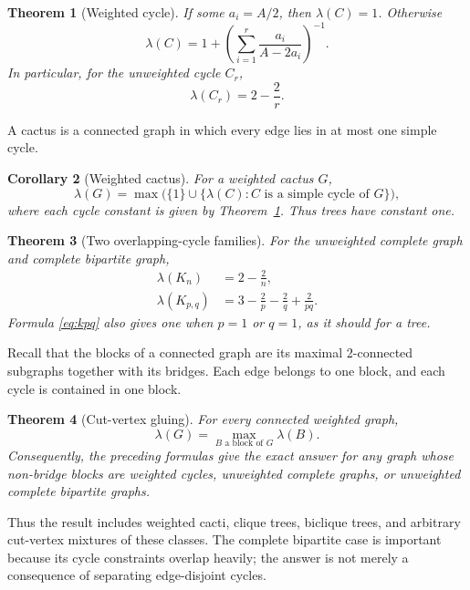 \documentclass[11pt]{article}
\newtheorem{theorem}{Theorem}
\newtheorem{corollary}[theorem]{Corollary}
\begin{document}
\begin{theorem}[Weighted cycle]\label{thm:cycle}
If some \(a_i=A/2\), then \(\lambda(C)=1\).  Otherwise
\begin{equation}\label{eq:cycle}
 \boxed{\displaystyle
 \lambda(C)=1+
 \left(\sum_{i=1}^r\frac{a_i}{A-2a_i}\right)^{-1}.}
\end{equation}
In particular, for the unweighted cycle \(C_r\),
\[
 \lambda(C_r)=2-\frac2r.
\]
\end{theorem}

A cactus is a connected graph in which every edge lies in at most one
simple cycle.

\begin{corollary}[Weighted cactus]\label{cor:cactus}
For a weighted cactus \(G\),
\[
 \lambda(G)=\max\bigl(\{1\}\cup\{\lambda(C):C\text{ is a simple cycle of }G\}\bigr),
\]
where each cycle constant is given by Theorem~\ref{thm:cycle}.  Thus trees
have constant one.
\end{corollary}

\begin{theorem}[Two overlapping-cycle families]\label{thm:dense}
For the unweighted complete graph and complete bipartite graph,
\begin{align}
 \lambda(K_n)&=2-\frac2n,\label{eq:kn}\\
 \lambda(K_{p,q})&=3-\frac2p-\frac2q+\frac{2}{pq}.
 \label{eq:kpq}
\end{align}
Formula \eqref{eq:kpq} also gives one when \(p=1\) or \(q=1\), as it
should for a tree.
\end{theorem}

Recall that the blocks of a connected graph are its maximal
2-connected subgraphs together with its bridges.  Each edge belongs to one
block, and each cycle is contained in one block.

\begin{theorem}[Cut-vertex gluing]\label{thm:blocks}
For every connected weighted graph,
\begin{equation}\label{eq:blockmax}
 \lambda(G)=\max_{B\text{ a block of }G}\lambda(B).
\end{equation}
Consequently, the preceding formulas give the exact answer for any graph
whose non-bridge blocks are weighted cycles, unweighted complete graphs, or
unweighted complete bipartite graphs.
\end{theorem}

Thus the result includes weighted cacti, clique trees, biclique trees, and
arbitrary cut-vertex mixtures of these classes.  The complete bipartite
case is important because its cycle constraints overlap heavily; the
answer is not merely a consequence of separating edge-disjoint cycles.
\end{document}
